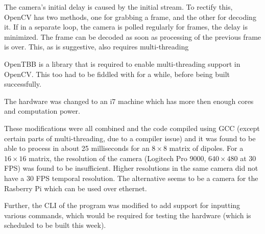 			\par
			The camera's initial delay is caused by the initial stream. To rectify this, OpenCV has two methods, one for grabbing a frame, and the other for decoding it. If in a separate loop, the camera is polled regularly for frames, the delay is minimized. The frame can be decoded as soon as processing of the previous frame is over. This, as is suggestive, also requires multi-threading
			\par
			OpenTBB is a library that is required to enable multi-threading support in OpenCV. This too had to be fiddled with for a while, before being built successfully.
			\par
			The hardware was changed to an i7 machine which has more then enough cores and computation power.
			\par
			These modifications were all combined and the code compiled using GCC (except certain parts of multi-threading, due to a compiler issue) and it was found to be able to process in about 25 milliseconds for an $8 \times 8$ matrix of dipoles. For a $16 \times 16$ matrix, the resolution of the camera (Logitech Pro 9000, $640 \times 480$ at 30 FPS) was found to be insufficient. Higher resolutions in the same camera did not have a 30 FPS temporal resolution. The alternative seems to be a camera for the Rasberry Pi which can be used over ethernet.
			\par
			Further, the CLI of the program was modified to add support for inputting various commands, which would be required for testing the hardware (which is scheduled to be built this week).
